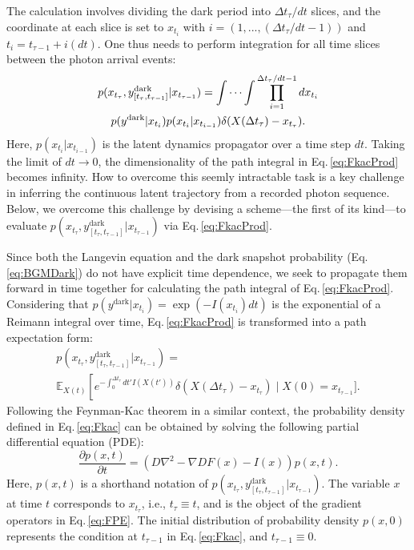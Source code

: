 \documentclass[journal=jpcbfk,manuscript=article,layout=twocolumn,articletitle=true]{achemso}
\begin{document}
The calculation involves dividing the dark period into $\Delta t_{\tau}/dt$ slices, and the coordinate at each slice is set to $x_{t_i}$ with $i=(1,...,(\Delta t_\tau/dt-1))$ and $t_i=t_{\tau -1}+i(dt)$. One thus needs to perform integration for all time slices between the photon arrival events:
\begin{multline}
\label{eq:FkacProd}
p(x_{t_\tau},y_{[t_\tau,t_{\tau-1}]}^{\text{dark}} | x_{t_{\tau-1}}) = \idotsint \prod^{{\Delta t_{\tau}}/dt-1}_{i=1} dx_{t_i} \\   p(y^{\text{dark}} |x_{t_i})   p(x_{t_i} | x_{t_{i-1}})\delta( X(\Delta t_\tau)-x_{t_\tau}).
\end{multline}
Here, $p(x_{t_i} | x_{t_{i-1}})$ is the latent dynamics propagator over a time step $dt$. Taking the limit of $dt\to 0$, the dimensionality of the path integral in Eq.\,\ref{eq:FkacProd} becomes infinity. How to overcome this seemly intractable task is a key challenge in inferring the continuous latent trajectory from a recorded photon sequence. Below, we overcome this challenge by devising a scheme---the first of its kind---to evaluate $p(x_{t_\tau},y_{[t_\tau,t_{\tau-1}]}^{\text{dark}} | x_{t_{\tau-1}})$ via Eq.\,\ref{eq:FkacProd}.

Since both the Langevin equation and the dark snapshot probability (Eq.\,\ref{eq:BGMDark}) do not have explicit time dependence, we seek to propagate them forward in time together for calculating the path integral of Eq.\,\ref{eq:FkacProd}. Considering that $p(y^{\text{dark}} |x_{t_i})=\exp(-I(x_{t_i})dt)$ is the exponential of a Reimann integral over time, Eq.\,\ref{eq:FkacProd} is transformed into a path expectation form:
\begin{multline}
\label{eq:Fkac}
p(x_{t_\tau},y_{[t_\tau,t_{\tau-1}]}^{\text{dark}} | x_{t_{\tau-1}}) = \\
\mathbb{E}_{X(t)} \left [ e^{-\int_0^{\Delta t_{\tau}} dt' I\left(X(t')\right)} \delta( X(\Delta t_\tau)-x_{t_\tau}) \right . \mid X(0)=x_{t_{\tau-1}} \bigg].
\end{multline} 
Following the Feynman-Kac theorem in a similar context,\cite{Gopich:2005co,Gopich:2003kb} the probability density defined in Eq.\,\ref{eq:Fkac} can be obtained by solving the following partial differential equation (PDE):
\begin{equation}
\label{eq:FPE}
\frac{\partial p(x,t)}{\partial t}= \left ( D\nabla^2 - \nabla DF(x) - I(x) \right ) p(x,t).
\end{equation}
Here, $p(x,t)$ is a shorthand notation of $p(x_{t_\tau},y_{[t_\tau,t_{\tau-1}]}^{\text{dark}} | x_{t_{\tau-1}})$. The variable $x$ at time $t$ corresponds to $x_{t_\tau}$, i.e., $t_\tau \equiv t$, and is the object of the gradient operators in Eq.\,\ref{eq:FPE}. The initial distribution of probability density $p(x,0)$ represents the condition at $t_{\tau-1}$ in Eq.\,\ref{eq:Fkac}, and $t_{\tau-1} \equiv 0$. 
\end{document}
